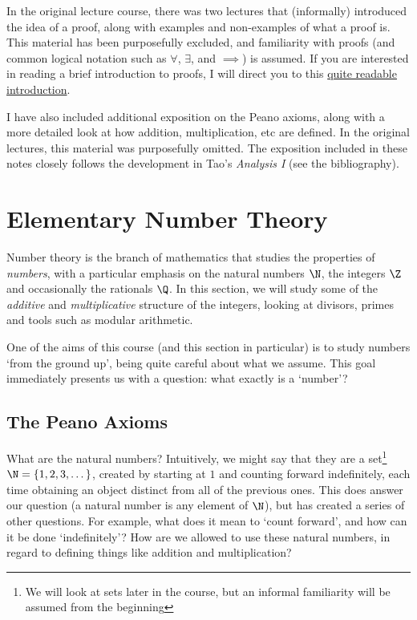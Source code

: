 \documentclass[a4paper]{scrreprt}
\begin{document}
In the original lecture course, there was two lectures that (informally) introduced the idea of a proof, along with examples and non-examples of what a proof is. This material has been purposefully excluded, and familiarity with proofs (and common logical notation such as $\forall$, $\exists$, and $\implies$) is assumed. 
If you are interested in reading a brief introduction to proofs, I will direct you to this \href{https://math.berkeley.edu/~hutching/teach/proofs.pdf}{quite readable introduction}.

I have also included additional exposition on the Peano axioms, along with a more detailed look at how addition, multiplication, etc are defined. In the original lectures, this material was purposefully omitted. The exposition included in these notes closely follows the development in Tao's \emph{Analysis I} (see the bibliography).

\clearpage


\chapter{Elementary Number Theory}\label{ch:1}

Number theory is the branch of mathematics that studies the properties of \emph{numbers}, with a particular emphasis on the natural numbers $\N$, the integers $\Z$ and occasionally the rationals $\Q$. In this section, we will study some of the \emph{additive} and \emph{multiplicative} structure of the integers, looking at divisors, primes and tools such as modular arithmetic. 

One of the aims of this course (and this section in particular) is to study numbers `from the ground up', being quite careful about what we assume. This goal immediately presents us with a question: what exactly is a `number'?


\section{The Peano Axioms}

What are the natural numbers? Intuitively, we might say that they are a set\footnote{We will look at sets later in the course, but an informal familiarity will be assumed from the beginning} $\N = \{1, 2, 3, \dots\}$, created by starting at $1$ and counting forward indefinitely, each time obtaining an object distinct from all of the previous ones.
	This does answer our question (a natural number is any element of $\N$), but has created a series of other questions. For example, what does it mean to `count forward', and how can it be done `indefinitely'? How are we allowed to use these natural numbers, in regard to defining things like addition and multiplication? 
	
\end{document}
